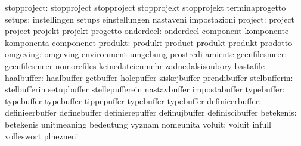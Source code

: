                      stopproject: stopproject                      stopproject
                                  stopprojekt                      stopprojekt
                                  terminaprogetto
                          setups: instellingen                     setups
                                  einstellungen                    nastaveni
                                  impostazioni
                         project: project                          project
                                  projekt                          projekt
                                  progetto
                       onderdeel: onderdeel                        component
                                  komponente                       komponenta
                                  componenet
                         produkt: produkt                          product
                                  produkt                          produkt
                                  prodotto
                        omgeving: omgeving                         environment
                                  umgebung                         prostredi
                                  amiente
                   geenfilesmeer: geenfilesmeer                    nomorefiles
                                  keinedateienmehr                 zadnedalsisoubory
                                  bastafile
                      haalbuffer: haalbuffer                       getbuffer
                                  holepuffer                       ziskejbuffer
                                  prendibuffer
                    stelbufferin: stelbufferin                     setupbuffer
                                  stellepufferein                  nastavbuffer
                                  impostabuffer
                      typebuffer: typebuffer                       typebuffer
                                  tippepuffer                      typebuffer
                                  typebuffer                       %
                 definieerbuffer: definieerbuffer                  definebuffer
                                  definierepuffer                  definujbuffer
                                  definiscibuffer
                       betekenis: betekenis                        unitmeaning
                                  bedeutung                        vyznam
                                  nomeunita                        %
                          voluit: voluit                           infull
                                  volleswort                       plnezneni
